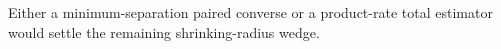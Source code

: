 Either a minimum-separation paired converse or a product-rate total estimator would settle the remaining shrinking-radius wedge.